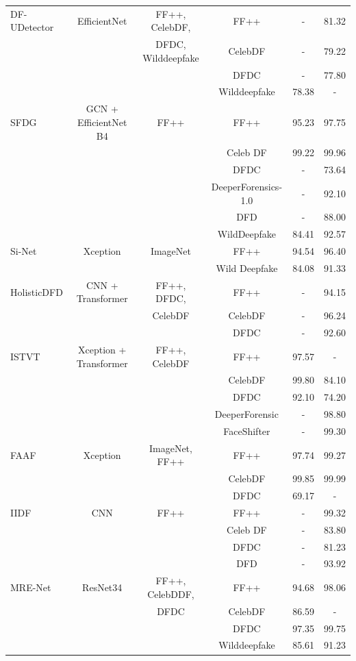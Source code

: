 \begin{table}[h]
{\begin{tabular}{lccccc}
\midrule
DF-UDetector \cite{ke2023} & EfficientNet & FF++, CelebDF, & FF++ & - & 81.32 \\
 &  & DFDC, Wilddeepfake & CelebDF & - & 79.22 \\
 &  &  & DFDC & - & 77.80 \\
 &  &  & Wilddeepfake & 78.38 & - \\
\midrule
SFDG \cite{wang2023dynamic} & GCN + EfficientNet B4 & FF++ & FF++ & 95.23 & 97.75 \\
 &  &  & Celeb DF & 99.22 & 99.96 \\
 &  &  & DFDC & - & 73.64 \\
 &  &  & DeeperForensics-1.0 & - & 92.10 \\
 &  &  & DFD & - & 88.00 \\
 &  &  & WildDeepfake & 84.41 & 92.57 \\
\midrule
Si-Net \cite{wang2023si} & Xception & ImageNet & FF++ & 94.54 & 96.40 \\
 &  &  & Wild Deepfake & 84.08 & 91.33 \\
\midrule
HolisticDFD \cite{raza2023} & CNN + Transformer & FF++, DFDC, & FF++ & - & 94.15 \\
 &  & CelebDF & CelebDF & - & 96.24 \\
 &  &  & DFDC & - & 92.60 \\
\midrule
ISTVT \cite{zhao2023} & Xception + Transformer & FF++, CelebDF & FF++ & 97.57 & - \\
 &  &  & CelebDF & 99.80 & 84.10 \\
 &  &  & DFDC & 92.10 & 74.20 \\
 &  &  & DeeperForensic & - & 98.80 \\
 &  &  & FaceShifter & - & 99.30 \\
\midrule
FAAF \cite{tian2023} & Xception & ImageNet, FF++ & FF++ & 97.74 & 99.27 \\
 &  &  & CelebDF & 99.85 & 99.99 \\
 &  &  & DFDC & 69.17 & - \\
\midrule
IIDF \cite{huang2023} & CNN & FF++ & FF++ & - & 99.32 \\
 &  &  & Celeb DF & - & 83.80 \\
 &  &  & DFDC & - & 81.23 \\
 &  &  & DFD & - & 93.92 \\
\midrule
MRE-Net \cite{pang2023} & ResNet34 & FF++, CelebDDF, & FF++ & 94.68 & 98.06 \\
 &  & DFDC & CelebDF & 86.59 & - \\
 &  &  & DFDC & 97.35 & 99.75 \\
 &  &  & Wilddeepfake & 85.61 & 91.23 \\
\bottomrule
\end{tabular}%
}
\end{table}

